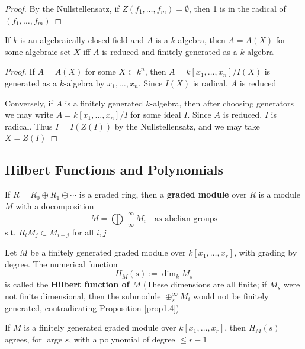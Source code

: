 \documentclass[11pt]{article}
\begin{document}
\begin{proof}
By the Nullstellensatz, if \(Z(f_1,\dots,f_m)=\emptyset\), then 1 is in the
radical of \((f_1,\dots,f_m)\)
\end{proof}

\begin{corollary}[]
If \(k\) is an algebraically closed field and \(A\) is a \(k\)-algebra, then
\(A=A(X)\) for some algebraic set \(X\) iff \(A\) is reduced and finitely
generated as a \(k\)-algebra
\end{corollary}

\begin{proof}
If \(A=A(X)\) for some \(X\subset k^n\), then \(A=k[x_1,\dots,x_n]/I(X)\) is
generated as a \(k\)-algebra by \(x_1,\dots,x_n\). Since \(I(X)\) is radical,
\(A\) is reduced

Conversely, if \(A\) is a finitely generated \(k\)-algebra, then after
choosing generators we may write \(A=k[x_1,\dots,x_n]/I\) for some ideal
\(I\). Since \(A\) is reduced, \(I\) is radical. Thus \(I=I(Z(I))\) by the
Nullstellensatz, and we may take \(X=Z(I)\)
\end{proof}
\subsection{Hilbert Functions and Polynomials}
\label{sec:org685036e}
\begin{definition}[]
If \(R=R_0\oplus R_1\oplus\cdots\) is a graded ring, then a \textbf{graded module}
over \(R\) is a module \(M\) with a docomposition
\begin{equation*}
M=\bigoplus_{-\infty}^{+\infty}M_i\quad\text{as abelian groups}
\end{equation*}
s.t. \(R_iM_j\subset M_{i+j}\) for all \(i,j\)
\end{definition}

\begin{definition}[]
Let \(M\) be a finitely generated graded module over \(k[x_1,\dots,x_r]\),
with grading by degree. The numerical function
\begin{equation*}
H_M(s):=\dim_kM_s
\end{equation*}
is called the \textbf{Hilbert function of \(M\)} (These dimensions are all finite; if
\(M_s\) were not finite dimensional, then the submodule
\(\oplus_s^{\infty}M_i\) would not be finitely generated, contradicating
Proposition \ref{prop1.4})
\end{definition}

\begin{theorem}[Hilbert]
\label{thm1.11}
If \(M\) is a finitely generated graded module over \(k[x_1,\dots,x_r]\),
then \(H_M(s)\) agrees, for large \(s\), with a polynomial of degree \(\le r-1\)
\end{theorem}
\end{document}
